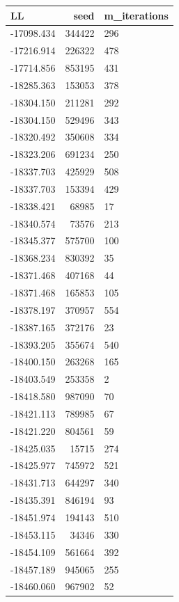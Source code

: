 \documentclass[]{book}
\theoremstyle{definition}
\theoremstyle{definition}
\theoremstyle{definition}
\theoremstyle{remark}
\begin{document}
\begin{tabular}{l|r|l}
\hline
LL & seed & m\_iterations\\
\hline
-17098.434 & 344422 & 296\\
\hline
-17216.914 & 226322 & 478\\
\hline
-17714.856 & 853195 & 431\\
\hline
-18285.363 & 153053 & 378\\
\hline
-18304.150 & 211281 & 292\\
\hline
-18304.150 & 529496 & 343\\
\hline
-18320.492 & 350608 & 334\\
\hline
-18323.206 & 691234 & 250\\
\hline
-18337.703 & 425929 & 508\\
\hline
-18337.703 & 153394 & 429\\
\hline
-18338.421 & 68985 & 17\\
\hline
-18340.574 & 73576 & 213\\
\hline
-18345.377 & 575700 & 100\\
\hline
-18368.234 & 830392 & 35\\
\hline
-18371.468 & 407168 & 44\\
\hline
-18371.468 & 165853 & 105\\
\hline
-18378.197 & 370957 & 554\\
\hline
-18387.165 & 372176 & 23\\
\hline
-18393.205 & 355674 & 540\\
\hline
-18400.150 & 263268 & 165\\
\hline
-18403.549 & 253358 & 2\\
\hline
-18418.580 & 987090 & 70\\
\hline
-18421.113 & 789985 & 67\\
\hline
-18421.220 & 804561 & 59\\
\hline
-18425.035 & 15715 & 274\\
\hline
-18425.977 & 745972 & 521\\
\hline
-18431.713 & 644297 & 340\\
\hline
-18435.391 & 846194 & 93\\
\hline
-18451.974 & 194143 & 510\\
\hline
-18453.115 & 34346 & 330\\
\hline
-18454.109 & 561664 & 392\\
\hline
-18457.189 & 945065 & 255\\
\hline
-18460.060 & 967902 & 52\\
\hline

\end{tabular}
\end{document}
